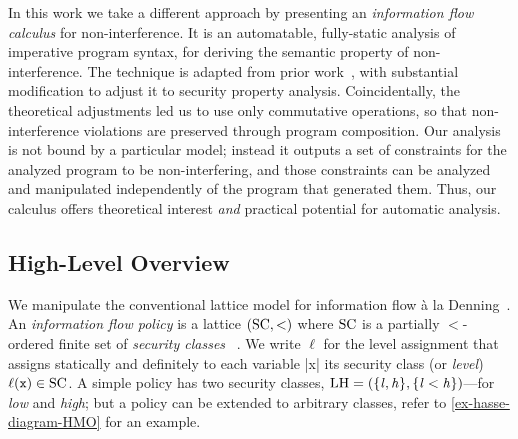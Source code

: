 In this work we take a different approach by presenting an \emph{information flow calculus} for non-interference.
It is an automatable, fully-static analysis of imperative program syntax, for deriving the semantic property of non-interference.
The technique is adapted from prior work~\cite{Aubert2023a}, with substantial modification to adjust it to security property analysis.
Coincidentally, the theoretical adjustments led us to use only commutative operations, so that non-interference violations are preserved through program composition.
Our analysis is not bound by a particular model;
instead it outputs a set of constraints for the analyzed program to be non-interfering, and
those constraints can be analyzed and manipulated independently of the program that generated them.
Thus, our calculus offers %
theoretical interest \emph{and} practical potential for automatic %
analysis.

\subsection{High-Level Overview}
\label{plas-overview}

We manipulate the conventional lattice model for information flow à la Denning~\cite{Denning76}.
An \emph{information flow policy} is a lattice \((\mathrm{SC}, <)\) where \(\mathrm{SC}\) is a partially \(<\)-ordered finite set of \emph{security classes}%
~\cite{VolpanoI1996}.
We write \(\ell\) for the level assignment that assigns statically and definitely to each variable \prc|x| its security class (or \emph{level}) \(\ell(\mathtt{x}) \in \mathrm{SC}\).
A simple policy has two security classes, \eg
\(\mathrm{LH}=(\{\mathit{l}, \mathit{h}\}, \{\mathit{l} < \mathit{h}\})\)---for \emph{low} and \emph{high};
but a policy can be extended to arbitrary classes, refer to \autoref{ex-hasse-diagram-HMO} for an example.

